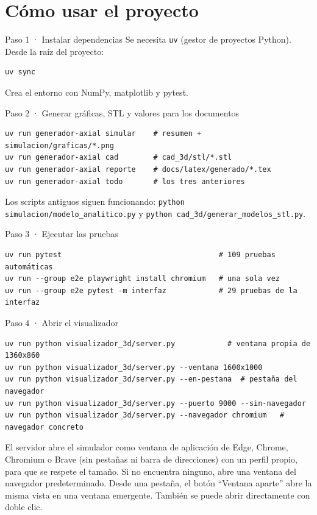 \documentclass[11pt]{article}
\begin{document}
\section{Cómo usar el proyecto}
\begin{paso}{Paso 1 · Instalar dependencias}
Se necesita \texttt{uv} (gestor de proyectos Python). Desde la raíz del proyecto:
\begin{lstlisting}[style=consola]
uv sync
\end{lstlisting}
Crea el entorno  con NumPy, matplotlib y pytest.
\end{paso}

\begin{paso}{Paso 2 · Generar gráficas, STL y valores para los documentos}
\begin{lstlisting}[style=consola]
uv run generador-axial simular    # resumen + simulacion/graficas/*.png
uv run generador-axial cad        # cad_3d/stl/*.stl
uv run generador-axial reporte    # docs/latex/generado/*.tex
uv run generador-axial todo       # los tres anteriores
\end{lstlisting}
Los scripts antiguos siguen funcionando: \texttt{python simulacion/modelo\_analitico.py} y
\texttt{python cad\_3d/generar\_modelos\_stl.py}.
\end{paso}

\begin{paso}{Paso 3 · Ejecutar las pruebas}
\begin{lstlisting}[style=consola]
uv run pytest                                    # 109 pruebas automáticas
uv run --group e2e playwright install chromium   # una sola vez
uv run --group e2e pytest -m interfaz            # 29 pruebas de la interfaz
\end{lstlisting}
\end{paso}

\begin{paso}{Paso 4 · Abrir el visualizador}
\begin{lstlisting}[style=consola]
uv run python visualizador_3d/server.py            # ventana propia de 1360x860
uv run python visualizador_3d/server.py --ventana 1600x1000
uv run python visualizador_3d/server.py --en-pestana  # pestaña del navegador
uv run python visualizador_3d/server.py --puerto 9000 --sin-navegador
uv run python visualizador_3d/server.py --navegador chromium   # navegador concreto
\end{lstlisting}
El servidor abre el simulador como ventana de aplicación de Edge, Chrome, Chromium o Brave (sin pestañas ni barra
de direcciones) con un perfil propio, para que se respete el tamaño. Si no encuentra ninguno, abre una ventana del
navegador predeterminado. Desde una pestaña, el botón ``Ventana aparte'' abre la misma vista en una ventana emergente.
También se puede abrir  directamente con doble clic.
\end{paso}
\end{document}
